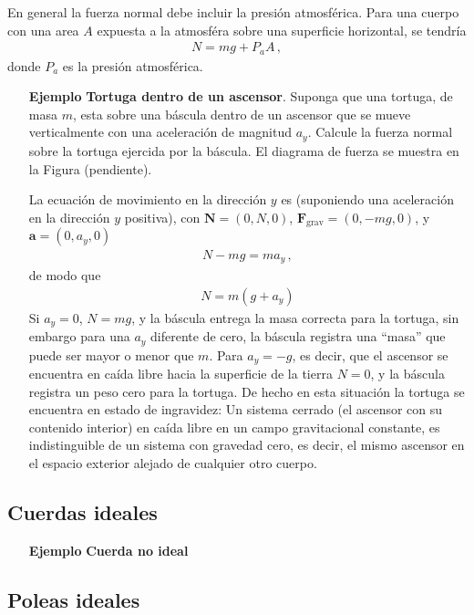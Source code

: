 En general la fuerza normal debe incluir la presión atmosférica. Para una cuerpo con una area $A$ expuesta a la atmosféra sobre una superficie horizontal, se tendría 
\begin{align}
 N=mg+P_a A\,, 
\end{align}
donde $P_a$ es la presión atmosférica. 
\begin{itemize}
\item[\textbf{Ejemplo}] \textbf{Tortuga dentro de un ascensor}. Suponga que una tortuga, de masa $m$, esta sobre una báscula dentro de un ascensor que se mueve verticalmente con una aceleración de magnitud $a_y$. Calcule la fuerza normal sobre la tortuga ejercida por la báscula. El diagrama de fuerza se muestra en la Figura (pendiente). 

La ecuación de movimiento en la dirección $y$ es (suponiendo una aceleración en la dirección $y$ positiva), con $\mathbf{N}=(0,N,0)$, $\mathbf{F}_{\text{grav}}=(0,-mg,0)$, y $\mathbf{a}=(0,a_y,0)$
\begin{align}
  N-mg=m a_y\,,
\end{align}
de modo que
\begin{align}
  N=m(g+a_y)
\end{align}
Si $a_y=0$, $N=mg$, y la báscula entrega la masa correcta para la
tortuga, sin embargo para una $a_y$ diferente de cero, la báscula
registra una ``masa'' que puede ser mayor o menor que $m$. Para
$a_y=-g$, es decir, que el ascensor se encuentra en caída libre hacia
la superficie de la tierra $N=0$, y la báscula registra un peso cero
para la tortuga. De hecho en esta situación la tortuga se encuentra en
estado de ingravidez: Un sistema cerrado (el ascensor con su contenido
interior) en caída libre en un campo gravitacional constante, es
indistinguible de un sistema con gravedad cero, es decir, el mismo
ascensor en el espacio exterior alejado de cualquier otro cuerpo.
\end{itemize}

\subsection{Cuerdas ideales}
\begin{itemize}
\item[\textbf{Ejemplo}] \textbf{Cuerda no ideal}
\end{itemize}

\subsection{Poleas ideales}

